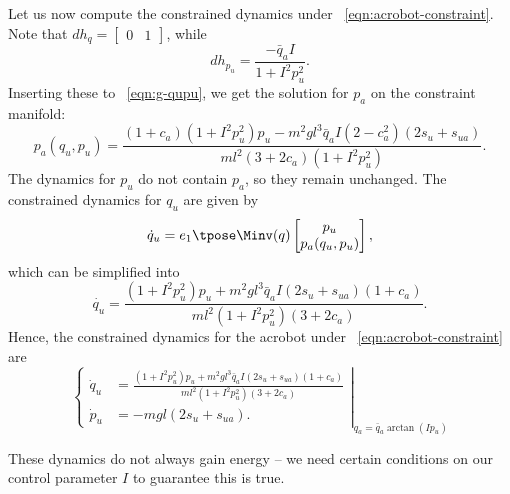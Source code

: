 Let us now compute the constrained dynamics under
~\eqref{eqn:acrobot-constraint}.
Note that \(dh_q = \begin{bmatrix}0 & 1\end{bmatrix}\), while
\[
    dh_{p_u} = \frac{-\bar{q}_a I}{1 + I^2 p_u^2}
    .
\]
Inserting these to ~\eqref{eqn:g-qupu}, we get the solution for \(p_a\) on the
constraint manifold:
\[
    p_a(q_u,p_u) = \frac{
        (1+c_a)(1+I^2 p_u^2)p_u - m^2gl^3\bar{q}_a I (2-c_a^2)(2s_u + s_{ua})
    }{ml^2(3+2c_a)(1+I^2 p_u^2)}
    .
\]
The dynamics for \(p_u\) do not contain \(p_a\), so they remain unchanged.
The constrained dynamics for \(q_u\) are given by 
\begin{equation*}
    \dot{q}_u = e_1\tpose \Minv(q) \begin{bmatrix}
                    p_u \\ p_a(q_u,p_u)
                \end{bmatrix} %
    ,
\end{equation*}
which can be simplified into 
\begin{equation*}
    \dot{q_u} = \frac{(1+I^2 p_u^2)p_u + m^2gl^3\bar{q}_a I(2s_u + s_{ua})(1+c_a) }{ml^2(1+I^2 p_u^2)(3+2c_a)}
    .
\end{equation*}
Hence, the constrained dynamics for the acrobot under
~\eqref{eqn:acrobot-constraint} are
\begin{equation}\label{eqn:acrobot-constrained-dynamics}
\left.\begin{cases}
    \dot{q}_u &= \frac{(1+I^2 p_u^2)p_u + m^2gl^3\bar{q}_a I(2s_u + s_{ua})(1+c_a) }
            {ml^2(1+I^2 p_u^2)(3+2c_a)}
        \\
    \dot{p}_u &= - m g l (2s_u + s_{ua})
    .
    \end{cases} \right|_{q_a = \bar{q}_a\arctan(Ip_u)}
\end{equation}

These dynamics do not always gain energy -- we need certain conditions on our
control parameter \(I\) to guarantee this is true.

